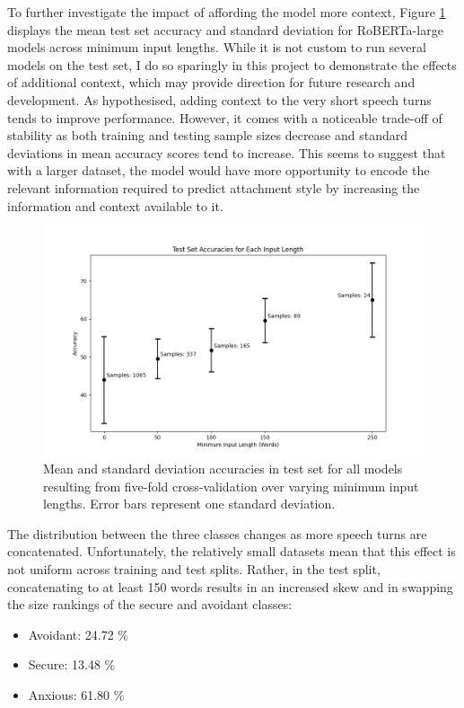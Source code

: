 \documentclass[12pt]{report}
\begin{document}
To further investigate the impact of affording the model more context, Figure \ref{fig: roberta-large results} displays the mean test set accuracy and standard deviation for RoBERTa-large models across minimum input lengths.
While it is not custom to run several models on the test set, I do so sparingly in this project to demonstrate the effects of additional context, which may provide direction for future research and development.
As hypothesised, adding context to the very short speech turns tends to improve performance.
However, it comes with a noticeable trade-off of stability as both training and testing sample sizes decrease and standard deviations in mean accuracy scores tend to increase.
This seems to suggest that with a larger dataset, the model would have more opportunity to encode the relevant information required to predict attachment style by increasing the information and context available to it.

\begin{figure}
    \includegraphics[width=\textwidth]{figures/roberta-large_acc_for_min_len.png}
    \caption{Mean and standard deviation accuracies in test set for all models resulting from five-fold cross-validation over varying minimum input lengths. Error bars represent one standard deviation.}
    \label{fig: roberta-large results}
\end{figure}

The distribution between the three classes changes as more speech turns are concatenated.
Unfortunately, the relatively small datasets mean that this effect is not uniform across training and test splits.
Rather, in the test split, concatenating to at least 150 words results in an increased skew and in swapping the size rankings of the secure and avoidant classes:
\begin{itemize}
    \item Avoidant: 24.72 \%
    \item Secure: 13.48 \%
    \item Anxious: 61.80 \%
\end{itemize}
\end{document}
